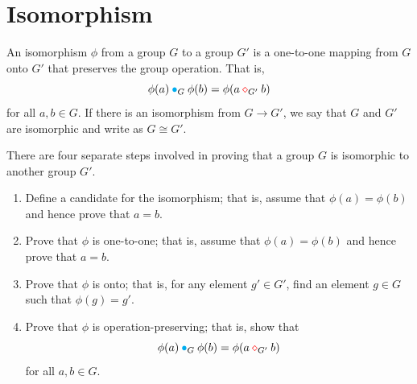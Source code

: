 \section{Isomorphism}
\begin{definition}
    An isomorphism $\phi$ from a group $G$ to a group $G'$ is a one-to-one 
mapping from $G$ onto $G'$ that preserves the group operation. That is, 
\[
    \phi(a) \> {\color{cyan} \bullet}_G \> \phi(b) = \phi(a \> {\color{red} \diamond}_{G'} \> b)
\]
for all $a,b \in G$. If there is an isomorphism from $G \to G'$, we say that $G$ and $G'$ are isomorphic 
and write as $G \cong G'$.
\end{definition}

There are four separate steps involved in proving that a group $G$ is isomorphic to another group $G'$.
\begin{enumerate}
    \item Define a candidate for the isomorphism; that is, assume that $\phi(a) = \phi(b)$ and hence prove that 
        $a=b$.
    \item Prove that $\phi$ is one-to-one; that is, assume that $\phi(a) = \phi(b)$ and hence 
    prove that $a=b$.
    \item  Prove that $\phi$ is onto; that is, for any element $g' \in G'$, find an element $g \in G$
    such that $\phi(g) = g'$.
    \item Prove that $\phi$ is operation-preserving; that is, show that 
    \[
        \phi(a) \> {\color{cyan} \bullet}_G \> \phi(b) = \phi(a \> {\color{red} \diamond}_{G'} \> b)
    \]
    for all $a, b \in G$. 
\end{enumerate}

